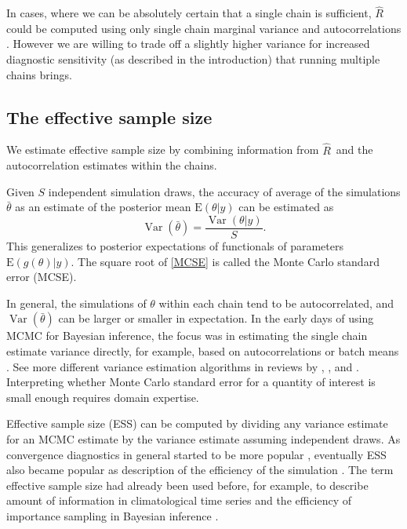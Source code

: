 \documentclass[american,]{article}
\DeclareMathOperator{\Var}{Var}
\newcommand{\Rhat}{$\widehat{R}$}
\theoremstyle{definition}
\begin{document}
In cases, where we can be absolutely certain that a single chain is
sufficient, \(\widehat{R}\) could be computed using only
single chain marginal variance and autocorrelations \citep[see,
e.g.][]{vats2018revisiting}. However we are willing to trade off a
slightly higher variance for increased diagnostic sensitivity (as
described in the introduction) that running multiple chains brings.

\hypertarget{ESS}{%
\subsection{The effective sample size}\label{ESS}}

We estimate effective sample size by combining
information from \Rhat\ and the autocorrelation estimates within the
chains.

Given $S$ independent simulation draws, the accuracy of average of the
simulations \(\bar{\theta}\) as an estimate of the posterior mean
\(\mbox{E}(\theta | y)\) can be estimated as
\begin{equation}
  \Var(\bar{\theta}) = \frac{\Var(\theta|y)}{S}.
  \label{MCSE}
\end{equation}
This generalizes to posterior expectations of functionals of
parameters \(\mbox{E}\left(g(\theta) | y\right)\).  The square root of
\eqref{MCSE} is called the Monte Carlo standard error (MCSE).

In general, the simulations of \(\theta\) within each chain
tend to be autocorrelated, and $\Var(\bar{\theta})$ can be larger or
smaller in expectation.
%
In the early days of using MCMC for Bayesian inference, the focus was
in estimating the single chain estimate variance directly, for
example, based on autocorrelations or batch means
\citep{Hastings:1970,Geyer:1992}. See more different variance
estimation algorithms in reviews by \citet{Cowles+Carlin:1996},
\citet{Mengersen+etal:1999}, and \citet{Robert+Casella:2004}.
%
Interpreting whether Monte Carlo standard error for a quantity of
interest is small enough requires domain expertise.

Effective sample size (ESS) can be computed by dividing any variance
estimate for an MCMC estimate by the variance estimate assuming
independent draws. As convergence diagnostics in general started to be
more popular
\citep{Gelman+Rubin:1992,Cowles+Carlin:1996,Mengersen+etal:1999,Robert+Casella:2004},
eventually ESS also became popular as description of the efficiency of
the simulation \citep[an early example of reporting ESS for Gibbs
sampler is][]{Sorensen+etal:1995}. The term effective sample size had
already been used before, for example, to describe amount of
information in climatological time series \citep{Laurmann+Gates:1977}
and the efficiency of importance sampling in Bayesian inference
\citep{Kong+Liu+Wong:1994}.
\end{document}
